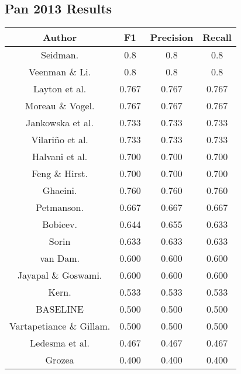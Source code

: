 \subsection{Pan 2013 Results}
\label{sec:pan2013res}

\begin{center}
\begin{tabular}{|c|c|c|c|}
\hline
\textbf{Author}          & \textbf{F1} & \textbf{Precision} & \textbf{Recall} \\ \hline
Seidman.                 & 0.8         & 0.8                & 0.8             \\ \hline
Veenman \& Li.           & 0.8         & 0.8                & 0.8             \\ \hline
Layton et al.            & 0.767       & 0.767              & 0.767           \\ \hline
Moreau \& Vogel.         & 0.767       & 0.767              & 0.767           \\ \hline
Jankowska et al.         & 0.733       & 0.733              & 0.733           \\ \hline
Vilariño et al.          & 0.733       & 0.733              & 0.733           \\ \hline
Halvani et al.           & 0.700       & 0.700              & 0.700           \\ \hline
Feng \& Hirst.           & 0.700       & 0.700              & 0.700           \\ \hline
Ghaeini.                 & 0.760       & 0.760              & 0.760           \\ \hline
Petmanson.               & 0.667       & 0.667              & 0.667           \\ \hline
Bobicev.                 & 0.644       & 0.655              & 0.633           \\ \hline
Sorin                    & 0.633       & 0.633              & 0.633           \\ \hline
van Dam.                 & 0.600       & 0.600              & 0.600           \\ \hline
Jayapal \& Goswami.      & 0.600       & 0.600              & 0.600           \\ \hline
Kern.                    & 0.533       & 0.533              & 0.533           \\ \hline
BASELINE                 & 0.500       & 0.500              & 0.500           \\ \hline
Vartapetiance \& Gillam. & 0.500       & 0.500              & 0.500           \\ \hline
Ledesma et al.           & 0.467       & 0.467              & 0.467           \\ \hline
Grozea                   & 0.400       & 0.400              & 0.400           \\ \hline
\end{tabular}
\end{center}

